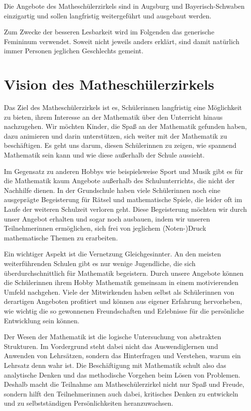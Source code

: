 \documentclass[12pt]{zettel}
\begin{document}
Die Angebote des Matheschülerzirkels sind in Augsburg und Bayerisch-Schwaben einzigartig
und sollen langfristig weitergeführt und ausgebaut werden.

Zum Zwecke der besseren Lesbarkeit wird im Folgenden das generische Femininum verwendet. Soweit nicht jeweils anders erklärt, sind damit natürlich immer Personen jeglichen
Geschlechts gemeint.

\tableofcontents


\section{Vision des Matheschülerzirkels}

Das Ziel des Matheschülerzirkels ist es, Schülerinnen langfristig eine Möglichkeit zu bieten, ihrem Interesse an der
Mathematik über den Unterricht hinaus nachzugehen. Wir möchten Kinder, die Spaß an der Mathematik gefunden haben, dazu animieren und darin unterstützen, sich weiter
mit der Mathematik zu beschäftigen. Es geht uns darum, diesen Schülerinnen zu zeigen, wie spannend Mathematik sein kann und wie diese außerhalb der Schule aussieht.

Im Gegensatz zu anderen Hobbys wie beispielsweise Sport und Musik gibt es für die Mathematik kaum Angebote außerhalb des Schulunterrichts, die nicht der Nachhilfe dienen.
In der Grundschule haben viele Schülerinnen noch eine ausgeprägte Begeisterung für 
Rätsel und mathematische Spiele, die leider oft im Laufe der weiteren
Schulzeit verloren geht. Diese Begeisterung möchten wir
durch unser Angebot erhalten und sogar noch ausbauen, indem wir
unseren Teilnehmerinnen ermöglichen, sich frei von jeglichem
(Noten-)Druck mathematische Themen zu erarbeiten.

Ein wichtiger Aspekt ist die Vernetzung Gleichgesinnter. An
den meisten weiterführenden Schulen gibt es nur wenige Jugendliche, die sich überdurchschnittlich für Mathematik begeistern. Durch unsere Angebote können die
Schülerinnen ihrem Hobby Mathematik gemeinsam in einem motivierenden Umfeld nachgehen. Viele der Mitwirkenden haben selbst als Schülerinnen von derartigen Angeboten
profitiert und können aus eigener Erfahrung hervorheben, wie wichtig die so gewonnenen Freundschaften und Erlebnisse für die persönliche Entwicklung sein können.

Der Wesen der Mathematik ist die logische Untersuchung von abstrakten Strukturen. Im Vordergrund steht dabei nicht das Auswendiglernen und Anwenden von Lehrsätzen, sondern
das Hinterfragen und Verstehen, warum ein Lehrsatz denn wahr ist. Die Beschäftigung mit Mathematik schult also das analytische Denken und das methodische Vorgehen beim Lösen
von Problemen. Deshalb macht die Teilnahme am Matheschülerzirkel nicht nur Spaß und Freude, sondern hilft den Teilnehmerinnen auch dabei, kritisches Denken
zu entwickeln und zu selbstständigen Persönlichkeiten heranzuwachsen.
\end{document}
